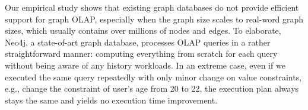 
Our empirical study shows that existing graph databases do not provide efficient support for graph OLAP, especially when the graph size scales to real-word graph sizes, which usually contains over millions of nodes and edges. %
To elaborate, Neo4j, a state-of-art graph database, processes OLAP queries in a rather straightforward manner: computing everything from scratch for each query without being aware of any history workloads. In an extreme case, even if we executed the same query repeatedly with only minor change on value constraints, e.g., change the constraint of user's age from 20 to 22, the execution plan always stays the same and yields no execution time improvement.

